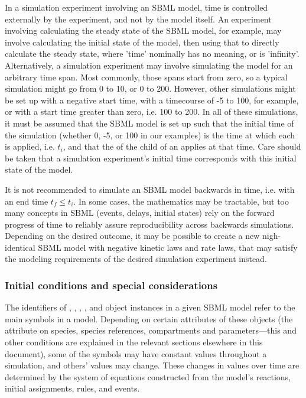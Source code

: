 \begin{blockChanged}
  In a simulation experiment involving an SBML model, time is controlled externally by the experiment, and not by the model itself.  An experiment involving calculating the steady state of the SBML model, for example, may involve calculating the initial state of the model, then using that to directly calculate the steady state, where 'time' nominally has no meaning, or is 'infinity'.  Alternatively, a simulation experiment may involve simulating the model for an arbitrary time span.  Most commonly, those spans start from zero, so a typical simulation might go from 0 to 10, or 0 to 200.  However, other simulations might be set up with a negative start time, with a timecourse of -5 to 100, for example, or with a start time greater than zero, i.e. 100 to 200.  In all of these simulations, it must be assumed that the SBML model is set up such that the initial time of the simulation (whether 0, -5, or 100 in our examples) is the time at which each \InitialAssignment is applied, i.e. $t_i$, and that the  of the \Trigger child of an \Event applies at that time.  Care should be taken that a simulation experiment's initial time corresponds with this initial state of the model.

  It is not recommended to simulate an SBML model backwards in time, i.e. with an end time $t_f \leq t_i$.  In some cases, the mathematics may be tractable, but too many concepts in SBML (events, delays, initial states) rely on the forward progress of time to reliably assure reproducibility across backwards simulations.  Depending on the desired outcome, it may be possible to create a new nigh-identical SBML model with negative kinetic laws and rate laws, that may satisfy the modeling requirements of the desired simulation experiment instead.
\end{blockChanged}


\subsubsection{Initial conditions and special considerations}
\label{sec:before-t0}

The identifiers of \Species, \SpeciesReference, \Compartment, \Parameter, and
\Reaction object instances in a given SBML model refer to the main
symbols in a model.  Depending on certain attributes of these
objects (\eg the attribute  on species, species references, compartments
and parameters---this and other conditions are explained in the
relevant sections elsewhere in this document), some of the
symbols may have constant values throughout a simulation, and
others' values may change.  These changes in values over time are
determined by the system of equations constructed from the model's
reactions, initial assignments, rules, and events.

